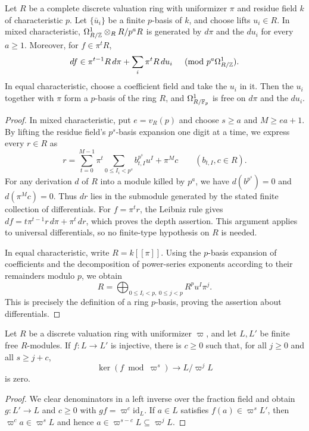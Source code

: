 \begin{lemma}\label{lem:review-finite-pbasis-differentials}
Let $R$ be a complete discrete valuation ring with uniformizer $\pi$ and residue field $k$ of characteristic $p$.
Let $\{\bar u_i\}$ be a finite $p$-basis of $k$, and choose lifts $u_i\in R$.
In mixed characteristic, $\Omega^1_{R/\mathbb Z}\otimes_R R/p^aR$ is generated by $d\pi$ and the $du_i$ for every $a\ge1$.
Moreover, for $f\in\pi^tR$,
\[
 df\in\pi^{t-1}R\,d\pi+
       \sum_i\pi^tR\,du_i
 \quad\pmod {p^a\Omega^1_{R/\mathbb Z}}.
\]
In equal characteristic, choose a coefficient field and take the $u_i$ in it.
Then the $u_i$ together with $\pi$ form a $p$-basis of the ring $R$, and $\Omega^1_{R/\mathbb F_p}$ is free on $d\pi$ and the $du_i$.
\end{lemma}
\begin{proof}
In mixed characteristic, put $e=v_R(p)$ and choose $s\ge a$ and $M\ge ea+1$.
By lifting the residue field's $p^s$-basis expansion one digit at a time, we express every $r\in R$ as
\[
 r=\sum_{t=0}^{M-1}\pi^t
      \sum_{0\le I_i<p^s}b_{t,I}^{p^s}u^I+\pi^Mc
 \qquad(b_{t,I},c\in R).
\]
For any derivation $d$ of $R$ into a module killed by $p^a$, we have $d(b^{p^s})=0$ and $d(\pi^Mc)=0$.
Thus $dr$ lies in the submodule generated by the stated finite collection of differentials.
For $f=\pi^tr$, the Leibniz rule gives $df=t\pi^{t-1}r\,d\pi+\pi^t\,dr$, which proves the depth assertion.
This argument applies to universal differentials, so no finite-type hypothesis on $R$ is needed.

In equal characteristic, write $R=k[[\pi]]$.
Using the $p$-basis expansion of coefficients and the decomposition of power-series exponents according to their remainders modulo $p$, we obtain
\[
 R=\bigoplus_{0\le I_i<p,\ 0\le j<p}
                  R^p u^I\pi^j.
\]
This is precisely the definition of a ring $p$-basis, proving the assertion about differentials.
\end{proof}

\begin{lemma}
\label{lem:review-finite-free-pro-kernel}
Let $R$ be a discrete valuation ring with uniformizer $\varpi$, and let $L,L'$ be finite free $R$-modules.
If $f\colon L\to L'$ is injective, there is $c\ge0$ such that, for all $j\ge0$ and all $s\ge j+c$,
\[
 \ker(f\bmod\varpi^s)\longrightarrow L/\varpi^jL
\]
is zero.
\end{lemma}
\begin{proof}
We clear denominators in a left inverse over the fraction field and obtain $g\colon L'\to L$ and $c\ge0$ with $gf=\varpi^c\mathrm{id}_L$.
If $a\in L$ satisfies $f(a)\in\varpi^sL'$, then $\varpi^ca\in\varpi^sL$ and hence $a\in\varpi^{s-c}L\subseteq\varpi^jL$.
\end{proof}

